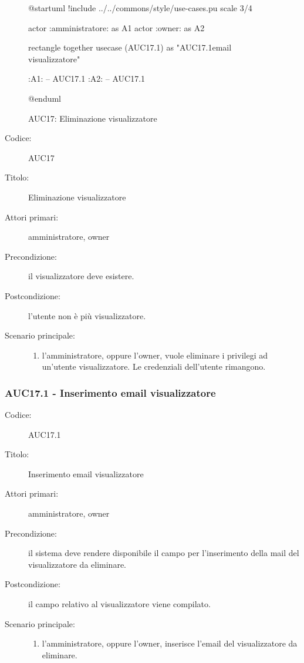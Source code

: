 \documentclass[../../../analisi-dei-requisiti.tex]{subfiles}
\begin{document}
\begin{figure}[h!]
  \centering
  \begin{plantuml}
  @startuml
  !include ../../commons/style/use-cases.pu
  scale 3/4

  actor :amministratore: as A1
  actor :owner: as A2

  rectangle {
    together {
      usecase (AUC17.1) as "AUC17.1\nInserimento email visualizzatore"
    }
  }

  :A1: -- AUC17.1
  :A2: -- AUC17.1

  @enduml
  \end{plantuml}
  \caption{AUC17: Eliminazione visualizzatore}
  \label{fig:auc17}
\end{figure}

\begin{description}
  \item[Codice:] AUC17
  \item[Titolo:] Eliminazione visualizzatore
  \item[Attori primari:] amministratore, owner
  \item[Precondizione:] il visualizzatore deve esistere.
  \item[Postcondizione:] l'utente non è più visualizzatore.
  \item[Scenario principale:]
  \begin{enumerate}
    \item l'amministratore, oppure l'owner, vuole eliminare i privilegi ad un'utente visualizzatore. Le credenziali dell'utente rimangono.
  \end{enumerate}
\end{description}

\subsubsection{AUC17.1 - Inserimento email visualizzatore}%
\label{subsub:AUC17.1}
\begin{description}
  \item[Codice:] AUC17.1
  \item[Titolo:] Inserimento email visualizzatore
  \item[Attori primari:] amministratore, owner
  \item[Precondizione:] il sistema deve rendere disponibile il campo per l'inserimento della mail del visualizzatore da eliminare.
  \item[Postcondizione:] il campo relativo al visualizzatore viene compilato.
  \item[Scenario principale:]
  \begin{enumerate}
    \item l'amministratore, oppure l'owner, inserisce l'email del visualizzatore da eliminare.
  \end{enumerate}
\end{description}
\end{document}
